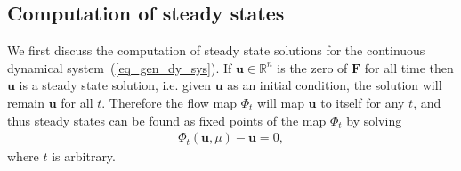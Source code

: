 \subsection{Computation of steady states}\label{sec_st_state}
We first discuss the computation of steady state solutions for the continuous dynamical system~(\ref{eq_gen_dy_sys}). If $\mathbf{u} \in \mathbb{R}^n$  is the zero of  $\mathbf{F}$ for all time  then $\mathbf{u}$ is a steady state solution, i.e. given $\mathbf{u}$ as an initial condition, the solution will remain $\mathbf{u}$ for all $t$. Therefore the flow map $\Phi_t$ will map $\mathbf{u}$ to itself for any $t$, and thus steady states can be found as fixed points of the map $\Phi_t$ by solving
\begin{align}
\label{fixed_point_map}\Phi_t(\mathbf{u},\mu) - \mathbf{u} = 0,
\end{align}
where $t$ is arbitrary.

